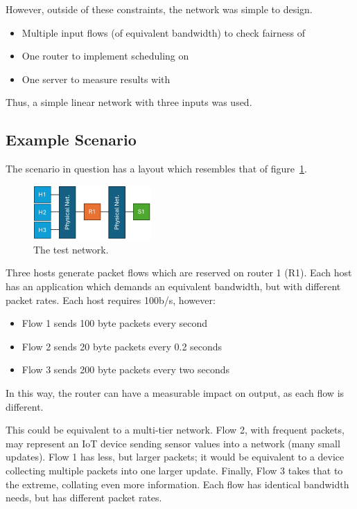 \documentclass[conference]{IEEEtran}
\begin{document}
However, outside of these constraints, the network was simple to design.
\begin{itemize}
    \item Multiple input flows (of equivalent bandwidth) to check fairness of
    \item One router to implement scheduling on
    \item One server to measure results with
\end{itemize}

Thus, a simple linear network with three inputs was used.

    \subsection{Example Scenario}
The scenario in question has a layout which resembles that of figure~\ref{fig:test-net}.

\begin{figure}[htbp]
    \centering
    \includegraphics[width=0.4\textwidth]{../img/test-network}
    \caption{The test network.}
    \label{fig:test-net}
\end{figure}

Three hosts generate packet flows which are reserved on router 1 (R1). Each host has an application which demands
an equivalent bandwidth, but with different packet rates. Each host requires 100b/s, however:
\begin{itemize}
    \item Flow 1 sends 100 byte packets every second
    \item Flow 2 sends 20 byte packets every 0.2 seconds
    \item Flow 3 sends 200 byte packets every two seconds
\end{itemize}

In this way, the router can have a measurable impact on output, as each flow is different.

This could be equivalent to a multi-tier network.
Flow 2, with frequent packets, may represent an IoT device sending sensor values into a network (many small updates).
Flow 1 has less, but larger packets; it would be equivalent to a device collecting multiple packets into one larger update.
Finally, Flow 3 takes that to the extreme, collating even more information.
Each flow has identical bandwidth needs, but has different packet rates.
\end{document}
